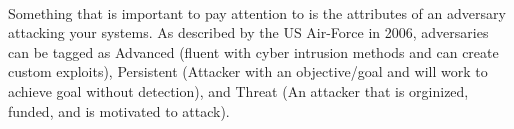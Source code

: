 \documentclass[12pt]{article}
\begin{document}
\paragraph{}Something that is important to pay attention to is the attributes of an adversary attacking your systems.
As described by the US Air-Force in 2006, adversaries can be tagged as Advanced (fluent with cyber intrusion methods and can create custom exploits), Persistent (Attacker with an objective/goal and will work to achieve goal without detection), and Threat (An attacker that is orginized, funded, and is motivated to attack).
\end{document}
